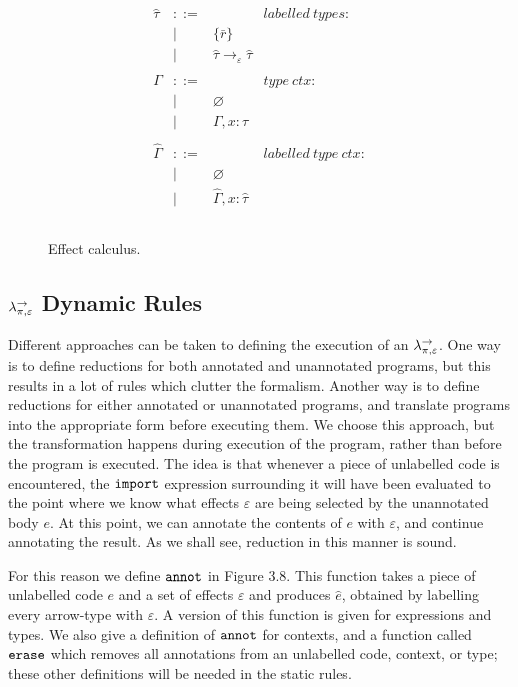 \begin{figure}[h]
\[\begin{array}{lll}
\begin{array}{lllr}
\hat \tau & ::= & ~ & labelled ~types: \\
		& | & \{ \bar r \} \\
		& | & \hat \tau \rightarrow_{\varepsilon} \hat \tau \\
		&&\\

\Gamma & ::= & ~ & type~ctx: \\
				& | & \varnothing \\
				& | & \Gamma, x: \tau \\
				&&\\
				
\hat \Gamma & ::= & ~ & labelled~type~ctx:\\
				& | & \varnothing \\
				& | & \hat \Gamma, x: \hat \tau \\
				&&\\

\end{array}

\end{array}
\]

\vspace{-7pt}
\caption{Effect calculus.}
\label{This is the label.}
\end{figure}



\subsection{$\lambda^{\rightarrow}_{\pi, \varepsilon}$ Dynamic Rules}

Different approaches can be taken to defining the execution of an $\lambda^{\rightarrow}_{\pi, \varepsilon}$. One way is to define reductions for both annotated and unannotated programs, but this results in a lot of rules which clutter the formalism. Another way is to define reductions for either annotated or unannotated programs, and translate programs into the appropriate form before executing them. We choose this approach, but the transformation happens during execution of the program, rather than before the program is executed. The idea is that whenever a piece of unlabelled code is encountered, the $\mathtt{import}$ expression surrounding it will have been evaluated to the point where we know what effects $\varepsilon$ are being selected by the unannotated body $e$. At this point, we can annotate the contents of $e$ with $\varepsilon$, and continue annotating the result. As we shall see, reduction in this manner is sound.

For this reason we define $\mathtt{annot}$ in Figure 3.8. This function takes a piece of unlabelled code $e$ and a set of effects $\varepsilon$ and produces $\hat e$, obtained by labelling every arrow-type with $\varepsilon$. A version of this function is given for expressions and types. We also give a definition of $\mathtt{annot}$ for contexts, and a function called $\mathtt{erase}$ which removes all annotations from an unlabelled code, context, or type; these other definitions will be needed in the static rules.

